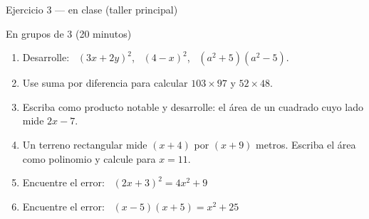 \documentclass[aspectratio=169,10pt]{beamer}
\begin{document}
\begin{frame}{Ejercicio 3 — en clase (taller principal)}
  \begin{alertblock}{En grupos de 3 (20 minutos)}
    \tiny
    \begin{enumerate}\setlength{\itemsep}{0.05cm}
      \item Desarrolle: \ $(3x+2y)^{2}$, \ $(4-x)^{2}$, \
            $(a^{2}+5)(a^{2}-5)$.
      \item Use suma por diferencia para calcular 
            $103 \times 97$ y $52 \times 48$.
      \item Escriba como producto notable y desarrolle: el área de un cuadrado
            cuyo lado mide $2x-7$.
      \item Un terreno rectangular mide $(x+4)$ por $(x+9)$ metros. Escriba el
            área como polinomio y calcule para $x=11$.
      \item Encuentre el error: \ $(2x+3)^{2} = 4x^{2}+9$
      \item Encuentre el error: \ $(x-5)(x+5) = x^{2}+25$
    \end{enumerate}
  \end{alertblock}
\end{frame}
\end{document}
